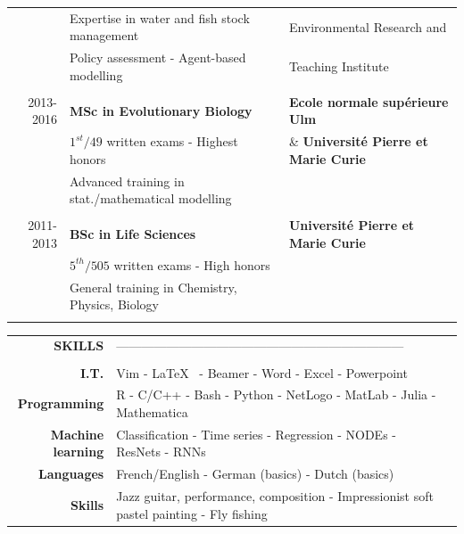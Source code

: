 \documentclass[11pt, oneside]{article}   	%
\begin{document}
\begin{tabular}{rll}
& Expertise in water and fish stock management & Environmental Research and \\
& Policy assessment - Agent-based modelling &  Teaching Institute \\
\\
2013-2016 & \textbf{MSc in Evolutionary Biology} & \textbf{Ecole normale supérieure Ulm} \\
	& $1^{st}/49$ written exams - Highest honors  & \& \textbf{Université Pierre et Marie Curie} \\
 & Advanced training in stat./mathematical modelling & \\
 \\
2011-2013 & \textbf{BSc in Life Sciences} & \textbf{Université Pierre et Marie Curie} \\
 & $5^{th}/505$ written exams - High honors  & \\
& General training in Chemistry, Physics, Biology & \\
\\
\end{tabular}

\hspace{-2.5cm}
\begin{tabular}{rll}
\textbf{SKILLS} & --------------------------------------------------------------------- &  \\
\\
\textbf{I.T.} & Vim - \LaTeX~ - Beamer - Word - Excel - Powerpoint & \\
\textbf{Programming} & R - C/C++ - Bash - Python - NetLogo - MatLab - Julia - Mathematica & \\
\textbf{Machine learning} & Classification - Time series - Regression - NODEs - ResNets - RNNs & \\
\textbf{Languages} & French/English - German (basics) - Dutch (basics) & \\
\textbf{Skills} & Jazz guitar, performance, composition - Impressionist soft pastel painting - Fly fishing
\end{tabular}



\end{document}
